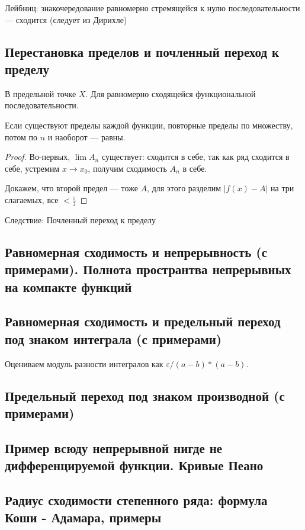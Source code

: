 \documentclass[12pt, a4paper, oneside]{memoir}
\begin{document}
Лейбниц: знакочередование равномерно стремящейся к нулю последовательности — сходится (следует из Дирихле)


\subsection{Перестановка пределов и почленный переход к пределу}

В предельной точке $X$. Для равномерно сходящейся функциональной последовательности.

 
Если существуют пределы каждой функции, повторные пределы по множеству, потом по $n$ и наоборот — равны.

\begin{proof}
    Во-первых, $\lim A_n$ существует: сходится в себе, так как ряд сходится в себе, устремим $x → x_0$, получим сходимость $A_n$ в себе.

    Докажем, что второй предел — тоже $A$, для этого разделим $|f(x) - A|$ на три слагаемых, все $< \frac{\varepsilon}{3}$
\end{proof}

Следствие: Почленный переход к пределу

\subsection{Равномерная сходимость и непрерывность (с примерами).
Полнота пространтва непрерывных на компакте функций}

\subsection{Равномерная сходимость и предельный переход под знаком интеграла (с примерами)}

Оцениваем модуль разности интегралов как $\varepsilon/(a - b) * (a - b)$.



\subsection{Предельный переход под знаком производной (с примерами)}
\subsection{Пример всюду непрерывной нигде не дифференцируемой функции. Кривые Пеано}
\subsection{Радиус сходимости степенного ряда: формула Коши - Адамара, примеры}
\end{document}
